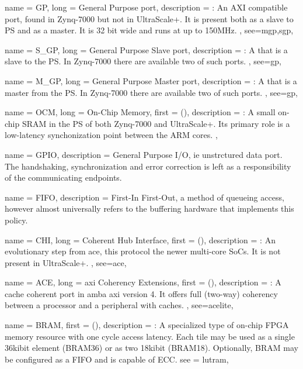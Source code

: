 {
	name = {GP},
	long = {General Purpose port},
	description = {\emph{}:
		An AXI compatible port, found in Zynq-7000 but not in UltraScale+.
		It is present both as a slave to PS and as a master. 
		It is 32 bit wide and runs at up to 150MHz.
	},
	see={mgp,sgp},
}

{
	name = {S\_GP},
	long = {General Purpose Slave port},
	description = {\emph{}:
		A  that is a slave to the PS. 
		In Zynq-7000 there are available two of such ports.
	},
	see={gp},
}

{
	name = {M\_GP},
	long = {General Purpose Master port},
	description = {\emph{}:
		A  that is a master from the PS. 
		In Zynq-7000 there are available two of such ports.
	},
	see={gp},
}

{
	name = {OCM},
	long = {On-Chip Memory},
	first = { ()},
	description = {\emph{}:
		A small on-chip SRAM in the PS of both Zynq-7000 and UltraScale+.
		Its primary role is a low-latency synchonization point between the ARM cores.
	},
}

{
	name = {GPIO},
	description = {
		General Purpose I/O, ie unstrctured data port. 
		The handshaking, synchronization and error correction
		is left as a responsibility of the communicating endpoints.
	}
}

{
	name = {FIFO},
	description = {
		First-In First-Out, a method of queueing access,
		however almost universally refers to the buffering hardware
		that implements this policy.
	}
}


{
	name = {CHI},
	long = {Coherent Hub Interface},
	first = { ()},
	description = {	\emph{}:
		An evolutionary step from \gls{ace}, this protocol the newer multi-core SoCs.
		It is not present in UltraScale+.
	},
	see={ace},
}

{
	name = {ACE},
	long = {\gls{axi} Coherency Extensions},
	first = { ()},
	description = {\emph{}:
		A cache coherent port in \gls{amba} \gls{axi} version 4. It offers full (two-way)
		coherency between a processor and a peripheral with caches.
	},
	see={acelite},
}

{
	name = {BRAM},
	first = { ()},
	description = {\emph{}:
		A specialized type of on-chip FPGA memory resource with one cycle access latency.
		Each tile may be used as a single 36kibit element (BRAM36) or as two 18kibit (BRAM18).
		Optionally, BRAM may be configured as a FIFO and is capable of ECC.
	}
	see = {lutram},
}

